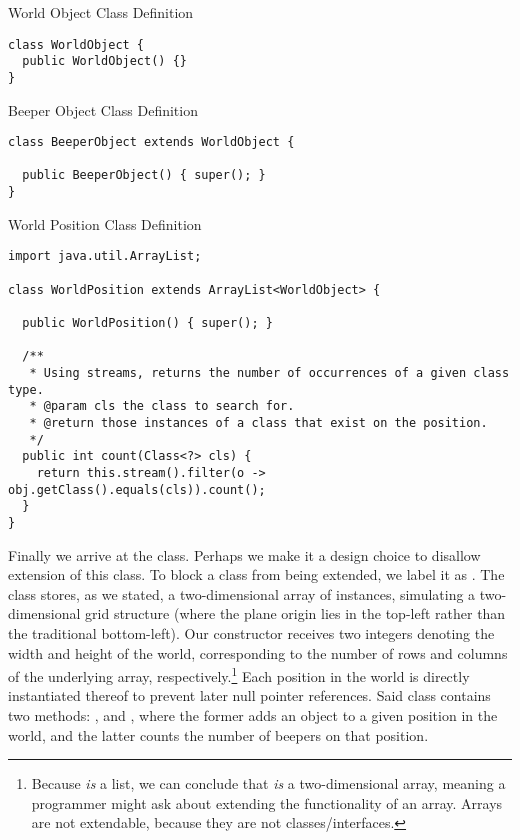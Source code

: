 \begin{cl}{World Object Class Definition}
\begin{lstlisting}[language=MyJava]
class WorldObject {
  public WorldObject() {}
}
\end{lstlisting}
\end{cl}

\begin{cl}{Beeper Object Class Definition}
\begin{lstlisting}[language=MyJava]
class BeeperObject extends WorldObject {
  
  public BeeperObject() { super(); }
}
\end{lstlisting}
\end{cl}

\begin{cl}{World Position Class Definition}
\begin{lstlisting}[language=MyJava]
import java.util.ArrayList;

class WorldPosition extends ArrayList<WorldObject> {

  public WorldPosition() { super(); }

  /**
   * Using streams, returns the number of occurrences of a given class type.
   * @param cls the class to search for.
   * @return those instances of a class that exist on the position.
   */
  public int count(Class<?> cls) {
    return this.stream().filter(o -> obj.getClass().equals(cls)).count();
  }
}
\end{lstlisting}
\end{cl}

Finally we arrive at the  class. Perhaps we make it a design choice to disallow extension of this class. To block a class from being extended, we label it as . The  class stores, as we stated, a two-dimensional array of  instances, simulating a two-dimensional grid structure (where the plane origin lies in the top-left rather than the traditional bottom-left). Our constructor receives two integers denoting the width and height of the world, corresponding to the number of rows and columns of the underlying array, respectively.\footnote{Because  \textit{is} a list, we can conclude that  \textit{is} a two-dimensional array, meaning a programmer might ask about extending the functionality of an array. Arrays are not extendable, because they are not classes/interfaces.} Each position in the world is directly instantiated thereof to prevent later null pointer references. Said  class contains two methods: , and , where the former adds an object to a given position in the world, and the latter counts the number of beepers on that position.


